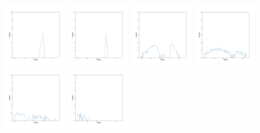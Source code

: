 \documentclass[12pt,prd]{article}
\begin{document}
\begin{figure}[h!]
\includegraphics[width=0.24\textwidth]{../figures/stars_passing_cut_rahistgaiascan_l101_2_b58_4_ra212_7_dec55_2_npy_11.pdf}
\includegraphics[width=0.24\textwidth]{../figures/stars_passing_cut_rahistgaiascan_l101_2_b58_4_ra212_7_dec55_2_npy_12.pdf}
\includegraphics[width=0.24\textwidth]{../figures/stars_passing_cut_rahistgaiascan_l101_2_b58_4_ra212_7_dec55_2_npy_13.pdf}
\includegraphics[width=0.24\textwidth]{../figures/stars_passing_cut_rahistgaiascan_l101_2_b58_4_ra212_7_dec55_2_npy_14.pdf}
\includegraphics[width=0.24\textwidth]{../figures/stars_passing_cut_rahistgaiascan_l101_2_b58_4_ra212_7_dec55_2_npy_15.pdf}
\includegraphics[width=0.24\textwidth]{../figures/stars_passing_cut_rahistgaiascan_l101_2_b58_4_ra212_7_dec55_2_npy_16.pdf}

\end{figure}
\end{document}
